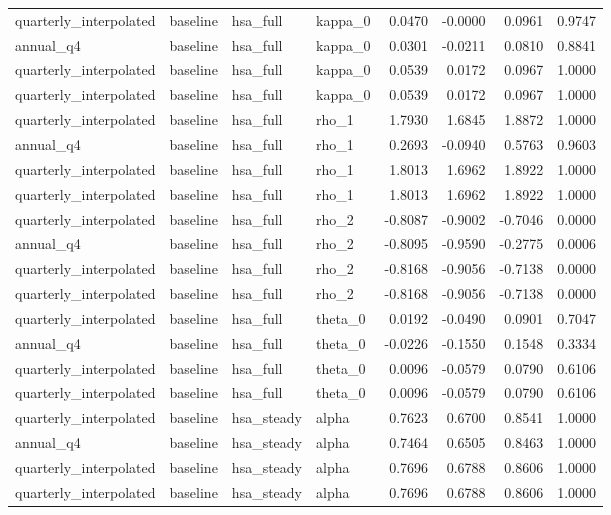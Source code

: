 \begin{tabular}{llllrrrr}
quarterly\_interpolated & baseline & hsa\_full & kappa\_0 & 0.0470 & -0.0000 & 0.0961 & 0.9747 \\
annual\_q4 & baseline & hsa\_full & kappa\_0 & 0.0301 & -0.0211 & 0.0810 & 0.8841 \\
quarterly\_interpolated & baseline & hsa\_full & kappa\_0 & 0.0539 & 0.0172 & 0.0967 & 1.0000 \\
quarterly\_interpolated & baseline & hsa\_full & kappa\_0 & 0.0539 & 0.0172 & 0.0967 & 1.0000 \\
quarterly\_interpolated & baseline & hsa\_full & rho\_1 & 1.7930 & 1.6845 & 1.8872 & 1.0000 \\
annual\_q4 & baseline & hsa\_full & rho\_1 & 0.2693 & -0.0940 & 0.5763 & 0.9603 \\
quarterly\_interpolated & baseline & hsa\_full & rho\_1 & 1.8013 & 1.6962 & 1.8922 & 1.0000 \\
quarterly\_interpolated & baseline & hsa\_full & rho\_1 & 1.8013 & 1.6962 & 1.8922 & 1.0000 \\
quarterly\_interpolated & baseline & hsa\_full & rho\_2 & -0.8087 & -0.9002 & -0.7046 & 0.0000 \\
annual\_q4 & baseline & hsa\_full & rho\_2 & -0.8095 & -0.9590 & -0.2775 & 0.0006 \\
quarterly\_interpolated & baseline & hsa\_full & rho\_2 & -0.8168 & -0.9056 & -0.7138 & 0.0000 \\
quarterly\_interpolated & baseline & hsa\_full & rho\_2 & -0.8168 & -0.9056 & -0.7138 & 0.0000 \\
quarterly\_interpolated & baseline & hsa\_full & theta\_0 & 0.0192 & -0.0490 & 0.0901 & 0.7047 \\
annual\_q4 & baseline & hsa\_full & theta\_0 & -0.0226 & -0.1550 & 0.1548 & 0.3334 \\
quarterly\_interpolated & baseline & hsa\_full & theta\_0 & 0.0096 & -0.0579 & 0.0790 & 0.6106 \\
quarterly\_interpolated & baseline & hsa\_full & theta\_0 & 0.0096 & -0.0579 & 0.0790 & 0.6106 \\
quarterly\_interpolated & baseline & hsa\_steady & alpha & 0.7623 & 0.6700 & 0.8541 & 1.0000 \\
annual\_q4 & baseline & hsa\_steady & alpha & 0.7464 & 0.6505 & 0.8463 & 1.0000 \\
quarterly\_interpolated & baseline & hsa\_steady & alpha & 0.7696 & 0.6788 & 0.8606 & 1.0000 \\
quarterly\_interpolated & baseline & hsa\_steady & alpha & 0.7696 & 0.6788 & 0.8606 & 1.0000 \\

\end{tabular}
